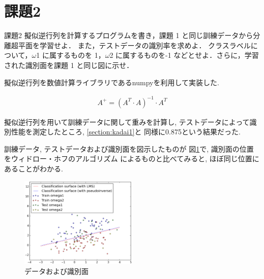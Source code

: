 \documentclass[10pt,a4paper,twocolumn]{jarticle}
\begin{document}
\section{課題2}\label{section:kadai2}
\begin{itembox}{課題2}
  擬似逆行列を計算するプログラムを書き，課題 1 と同じ訓練データから分離超平面を学習せよ．
  また，テストデータの識別率を求めよ．
  クラスラベルについて，$\omega$1 に属するものを 1，$\omega$2 に属するものを-1 などとせよ．さらに，学習された識別面を課題 1 と同じ図に示せ．
\end{itembox}

擬似逆行列を数値計算ライブラリであるnumpyを利用して実装した. 

\begin{eqnarray*}
  A^{+} = (A^{T} \cdot A)^{-1} \cdot A^{T}
\end{eqnarray*}

擬似逆行列を用いて訓練データに関して重みを計算し, 
テストデータによって識別性能を測定したところ, \ref{section:kadai1}と
同様に0.875という結果だった. 

訓練データ, テストデータおよび識別面を図示したものが
図\ref{fig:kadai2}で, 識別面の位置をウィドロー・ホフのアルゴリズム
によるものと比べてみると, ほぼ同じ位置にあることがわかる. 

\begin{figure}[htbp]
  \centering
  \includegraphics[width=0.5\textwidth]{./assets/kadai2_plot_20150122_031556.eps}
  \caption{データおよび識別面}
  \label{fig:kadai2}
\end{figure}

\end{document}
